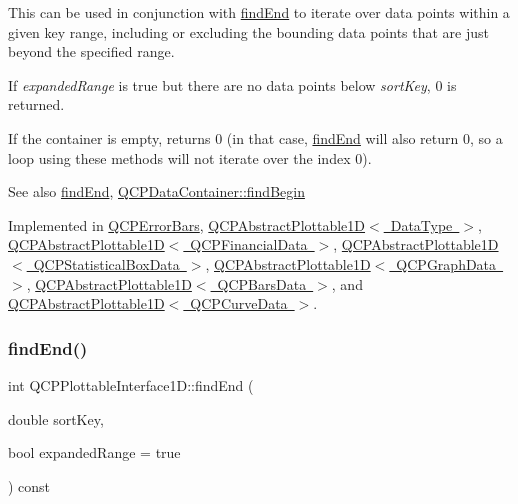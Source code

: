This can be used in conjunction with \mbox{\hyperlink{class_q_c_p_plottable_interface1_d_a5deced1016bc55a41a2339619045b295}{find\+End}} to iterate over data points within a given key range, including or excluding the bounding data points that are just beyond the specified range.

If {\itshape expanded\+Range} is true but there are no data points below {\itshape sort\+Key}, 0 is returned.

If the container is empty, returns 0 (in that case, \mbox{\hyperlink{class_q_c_p_plottable_interface1_d_a5deced1016bc55a41a2339619045b295}{find\+End}} will also return 0, so a loop using these methods will not iterate over the index 0).

\begin{DoxySeeAlso}{See also}
\mbox{\hyperlink{class_q_c_p_plottable_interface1_d_a5deced1016bc55a41a2339619045b295}{find\+End}}, \mbox{\hyperlink{class_q_c_p_data_container_a2ad8a5399072d99a242d3a6d2d7e278a}{Q\+C\+P\+Data\+Container\+::find\+Begin}} 
\end{DoxySeeAlso}


Implemented in \mbox{\hyperlink{class_q_c_p_error_bars_a74c57d6abb8eda3c4c31b72d1df9f568}{Q\+C\+P\+Error\+Bars}}, \mbox{\hyperlink{class_q_c_p_abstract_plottable1_d_ad0b46d25cde3d035b180fb8f10c056e6}{Q\+C\+P\+Abstract\+Plottable1\+D$<$ Data\+Type $>$}}, \mbox{\hyperlink{class_q_c_p_abstract_plottable1_d_ad0b46d25cde3d035b180fb8f10c056e6}{Q\+C\+P\+Abstract\+Plottable1\+D$<$ Q\+C\+P\+Financial\+Data $>$}}, \mbox{\hyperlink{class_q_c_p_abstract_plottable1_d_ad0b46d25cde3d035b180fb8f10c056e6}{Q\+C\+P\+Abstract\+Plottable1\+D$<$ Q\+C\+P\+Statistical\+Box\+Data $>$}}, \mbox{\hyperlink{class_q_c_p_abstract_plottable1_d_ad0b46d25cde3d035b180fb8f10c056e6}{Q\+C\+P\+Abstract\+Plottable1\+D$<$ Q\+C\+P\+Graph\+Data $>$}}, \mbox{\hyperlink{class_q_c_p_abstract_plottable1_d_ad0b46d25cde3d035b180fb8f10c056e6}{Q\+C\+P\+Abstract\+Plottable1\+D$<$ Q\+C\+P\+Bars\+Data $>$}}, and \mbox{\hyperlink{class_q_c_p_abstract_plottable1_d_ad0b46d25cde3d035b180fb8f10c056e6}{Q\+C\+P\+Abstract\+Plottable1\+D$<$ Q\+C\+P\+Curve\+Data $>$}}.

\mbox{\label{class_q_c_p_plottable_interface1_d_a5deced1016bc55a41a2339619045b295}} 
\subsubsection{\texorpdfstring{findEnd()}{findEnd()}}
{\footnotesize\ttfamily int Q\+C\+P\+Plottable\+Interface1\+D\+::find\+End (\begin{DoxyParamCaption}\item[{double}]{sort\+Key,  }\item[{bool}]{expanded\+Range = {\ttfamily true} }\end{DoxyParamCaption}) const\hspace{0.3cm}{\ttfamily [pure virtual]}}


